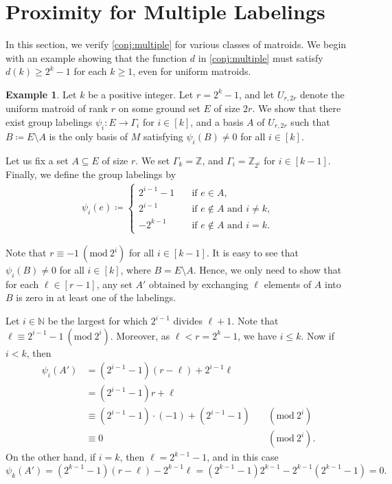 \documentclass{article}
\newcommand{\Mod}[1]{\ (\mathrm{mod}\ #1)}
\theoremstyle{definition}
\newtheorem{example}[theorem]{Example}
\newcommand{\N}{\mathbb{N}}
\newcommand{\Z}{\mathbb{Z}}
\begin{document}
\section{Proximity for Multiple Labelings}\label{sec:multiple-label}

In this section, we verify \cref{conj:multiple} for various classes of matroids.
We begin with an example showing that the function $d$ in \cref{conj:multiple} must satisfy $d(k) \ge 2^k-1$ for each $k\ge 1$, even for uniform matroids.


\begin{example} \label{ex:tight}
    Let $k$ be a positive integer. Let $r = 2^k-1$, and let $U_{r,2r}$ denote the uniform matroid of rank $r$ on some ground set $E$ of size $2r$. We show that there exist group labelings $\psi_i \colon E \to \Gamma_i$ for $i \in [k]$, and a basis $A$ of $U_{r,2r}$ such that $B \coloneqq E \setminus A$ is the only basis of $M$ satisfying $\psi_i(B) \ne 0$ for all $i \in [k]$.
    
    Let us fix a set $A \subseteq E$ of size $r$.
    We set $\Gamma_{k} = \Z$, and $\Gamma_i = \Z_{2^i}$ for $i \in [k-1]$. Finally, we define the group labelings by
    \begin{align}
        \psi_i(e) \coloneqq
        \begin{cases}
            2^{i-1} - 1 \hspace{1em} &\text{if } e \in A, \\
            2^{i-1} \hspace{1em} &\text{if } e \notin A \text{ and } i \neq k, \\
            -2^{k-1} \hspace{1em} &\text{if } e \notin A \text{ and } i = k.  
        \end{cases}
    \end{align}
    
    Note that $r \equiv -1 \Mod{2^i}$ for all $i \in [k-1]$. 
    It is easy to see that $\psi_i(B) \neq 0$ for all $i \in [k]$, where $B = E \setminus A$.
    Hence, we only need to show that for each $\ell \in [r-1]$, any set $A'$ obtained by exchanging $\ell$ elements of $A$ into $B$ is zero in at least one of the labelings.
    
    Let $i \in \N$ be the largest for which $2^{i-1}$ divides $\ell +1$. Note that $\ell \equiv 2^{i-1} - 1 \Mod{2^i}$. Moreover, as $\ell < r = 2^k - 1$, we have $i \leq k$. Now if $i < k$, then
    \begin{align}
        \psi_i(A') &= (2^{i-1} - 1)(r - \ell) + 2^{i-1}\ell \\
        &= (2^{i-1}-1)r + \ell \\
        &\equiv (2^{i-1}-1) \cdot (-1) + (2^{i-1} - 1) &&\Mod{2^i} \\ & \equiv 0 &&\Mod{2^i}.
    \end{align} 
    On the other hand, if $i = k$, then $\ell = 2^{k-1} - 1$, and in this case \[\psi_k(A') = (2^{k-1}-1)(r - \ell) - 2^{k-1}\ell = (2^{k-1}-1)2^{k-1} - 2^{k-1}(2^{k-1}-1) = 0.\]
\end{example}
\end{document}
